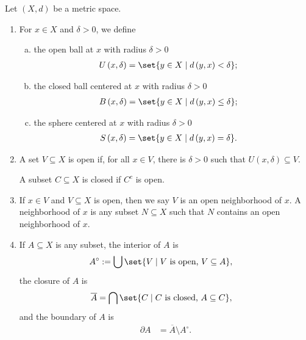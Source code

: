 \begin{definition}
  Let $\left(X,d\right)$ be a metric space.
  \begin{enumerate}[(1)]
    \item For $x\in X$ and $\delta > 0$, we define
      \begin{enumerate}[(a)]
        \item the open ball at $x$ with radius $\delta > 0$
          \begin{align*}
            U\left(x,\delta\right) &= \set{y\in X\mid d\left(y,x\right) < \delta};
          \end{align*}
        \item the closed ball centered at $x$ with radius $\delta > 0$
          \begin{align*}
            B\left(x,\delta\right) &= \set{y\in X\mid d\left(y,x\right)\leq \delta};
          \end{align*}
        \item the sphere centered at $x$ with radius $\delta > 0$
          \begin{align*}
            S\left(x,\delta\right) &= \set{y\in X\mid d\left(y,x\right) = \delta}.
          \end{align*}
      \end{enumerate}
    \item A set $V\subseteq X$ is open if, for all $x\in V$, there is $\delta > 0$ such that $U\left(x,\delta\right)\subseteq V$.\newline

      A subset $C\subseteq X$ is closed if $C^{c}$ is open.
    \item If $x\in V$ and $V\subseteq X$ is open, then we say $V$ is an open neighborhood of $x$. A neighborhood of $x$ is any subset $N\subseteq X$ such that $N$ contains an open neighborhood of $x$.
    \item If $A\subseteq X$ is any subset, the interior of $A$ is
      \begin{align*}
        A^{\circ} &:= \bigcup\set{V\mid V\text{ is open, }V\subseteq A},
      \end{align*}
      the closure of $A$ is
      \begin{align*}
        \overline{A} &= \bigcap\set{C\mid C\text{ is closed, }A\subseteq C},
      \end{align*}
      and the boundary of $A$ is
      \begin{align*}
        \partial A &= \overline{A} \setminus A^{\circ}.
      \end{align*}
  \end{enumerate}
\end{definition}
